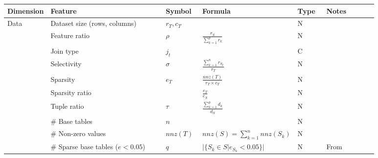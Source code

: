 \begin{tabular}{lp{0.35\linewidth}p{0.10\linewidth}>{\footnotesize}p{0.2\linewidth}p{0.08\linewidth}p{0.15\linewidth}}
    \toprule
    Dimension                              & Feature                                 & Symbol                            & Formula                                 & Type & Notes                  \\
    \midrule\midrule
    \multirow[t]{10}{*}{Data}              & Dataset size (rows, columns)            & $r_T, c_T$                        &                                         & N    &                        \\
                                           & Feature ratio                           & $\rho$                            & $\frac{r_S}{\sum_{k=1}^p r_k} $         & N    &                        \\
                                           & Join type                               & $j_t$                             &                                         & C    &                        \\
                                           & Selectivity                             & $\sigma$                          & $\frac{\sum_{k=1}^{n}r_{S_k}}{r_T}$     & N    &                        \\
                                           & Sparsity                                & $e_T$                             & $\frac{nnz(T)}{r_T\times c_T}$          & N    &                        \\
                                           & Sparsity ratio                          &                                   & $\frac{e_T}{e_S}$                       & N    &                        \\
                                           & Tuple ratio                             & $\tau$                            & $\frac{\sum_{k=1}^p d_k}{d_S}$          & N    &                        \\
                                           & \# Base tables                          & $n$                               &                                         & N    &                        \\
                                           & \# Non-zero values                      & $nnz(T)$                          & $nnz(S) = \sum_{k=1}^{n}nnz(S_k)$       & N    &                        \\
                                           & \# Sparse base tables ($e < 0.05$)      & $q$                               & $|\{S_k \in S| e_{S_k} < 0.05\}|$       & N    & From \cite{MorpheusFI} \\


\end{tabular}
